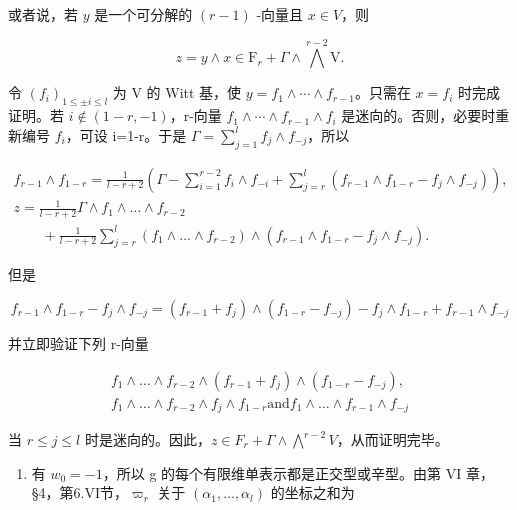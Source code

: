 或者说，若 \(y\) 是一个可分解的 \((r - 1)\) -向量且 \(x \in V\)，则

\[
z = y \wedge x \in \mathrm{F} _ {r} + \Gamma \wedge \bigwedge^ {r - 2} \mathrm{V}.
\]

令 \((f_{i})_{1\leq\pm i\leq l}\) 为 V 的 Witt 基，使 \(y=f_{1}\wedge\cdots\wedge f_{r-1}\)。只需在 \(x=f_{i}\) 时完成证明。若 \(i\notin(1-r,-1)\)，r-向量 \(f_{1}\wedge\cdots\wedge f_{r-1}\wedge f_{i}\) 是迷向的。否则，必要时重新编号 \(f_{i}\)，可设 i=1-r。于是 \(\Gamma=\sum_{j=1}^{l}f_{j}\wedge f_{-j}\)，所以

\[
\begin{array}{l} f _ {r - 1} \wedge f _ {1 - r} = \frac {1}{l - r + 2} \left(\Gamma - \sum_ {i = 1} ^ {r - 2} f _ {i} \wedge f _ {- i} + \sum_ {j = r} ^ {l} (f _ {r - 1} \wedge f _ {1 - r} - f _ {j} \wedge f _ {- j})\right), \\ z = \frac {1}{l - r + 2} \Gamma \wedge f _ {1} \wedge \dots \wedge f _ {r - 2} \\ \qquad + \frac {1}{l - r + 2} \sum_ {j = r} ^ {l} (f _ {1} \wedge \dots \wedge f _ {r - 2}) \wedge (f _ {r - 1} \wedge f _ {1 - r} - f _ {j} \wedge f _ {- j}). \end{array}
\]

但是

\[
f _ {r - 1} \wedge f _ {1 - r} - f _ {j} \wedge f _ {- j} = (f _ {r - 1} + f _ {j}) \wedge (f _ {1 - r} - f _ {- j}) - f _ {j} \wedge f _ {1 - r} + f _ {r - 1} \wedge f _ {- j}
\]

并立即验证下列 r-向量

\[
\begin{array}{c} f _ {1} \wedge \dots \wedge f _ {r - 2} \wedge (f _ {r - 1} + f _ {j}) \wedge (f _ {1 - r} - f _ {- j}), \\ f _ {1} \wedge \dots \wedge f _ {r - 2} \wedge f _ {j} \wedge f _ {1 - r} \text {and} f _ {1} \wedge \dots \wedge f _ {r - 1} \wedge f _ {- j} \end{array}
\]

当 \(r \leq j \leq l\) 时是迷向的。因此，\(z \in F_{r} + \Gamma \wedge \bigwedge^{r-2} V\)，从而证明完毕。

\begin{enumerate}
\def\labelenumi{(\Alph{enumi})}
\setcounter{enumi}{21}
\tightlist
\item
有 \(w_{0} = -1\)，所以 g 的每个有限维单表示都是正交型或辛型。由第 VI 章，§4，第6.VI节，\(\varpi_{r}\) 关于 \((\alpha_{1}, \ldots, \alpha_{l})\) 的坐标之和为
\end{enumerate}

